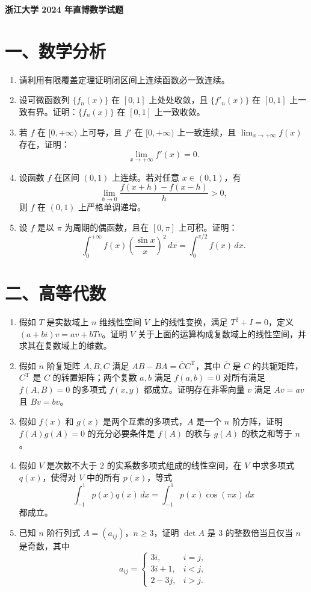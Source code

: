 \documentclass[UTF8,10pt,fontset=none]{ctexart}
\begin{document}
\begin{center}
  {\Large\bfseries 浙江大学 2024 年直博数学试题}
\end{center}
\vspace{1em}

\section*{一、数学分析}
\begin{enumerate}
\item 请利用有限覆盖定理证明闭区间上连续函数必一致连续。
\item 设可微函数列 $\{f_n(x)\}$ 在 $[0,1]$ 上处处收敛，且 $\{f'_n(x)\}$ 在 $[0,1]$ 上一致有界。证明：$\{f_n(x)\}$ 在 $[0,1]$ 上一致收敛。
\item 若 $f$ 在 $[0,+\infty)$ 上可导，且 $f'$ 在 $[0,+\infty)$ 上一致连续，且 $\lim_{x\to+\infty}f(x)$ 存在，证明：
\[
\lim_{x\to+\infty}f'(x)=0.
\]
\item 设函数 $f$ 在区间 $(0,1)$ 上连续。若对任意 $x\in(0,1)$，有
\[
\lim_{h\to0}\frac{f(x+h)-f(x-h)}{h}>0,
\]
则 $f$ 在 $(0,1)$ 上严格单调递增。
\item 设 $f$ 是以 $\pi$ 为周期的偶函数，且在 $[0,\pi]$ 上可积。证明：
\[
\int_0^{+\infty}f(x)\left(\frac{\sin x}{x}\right)^2\,dx
=\int_0^{\pi/2}f(x)\,dx.
\]
\end{enumerate}

\section*{二、高等代数}
\begin{enumerate}
\item 假如 $T$ 是实数域上 $n$ 维线性空间 $V$ 上的线性变换，满足 $T^2+I=0$，定义 $(a+bi)v=av+bTv$。证明 $V$ 关于上面的运算构成复数域上的线性空间，并求其在复数域上的维数。
\item 假如 $n$ 阶复矩阵 $A,B,C$ 满足 $AB-BA=\overline C C^{\mathrm T}$，其中 $\overline C$ 是 $C$ 的共轭矩阵，$C^{\mathrm T}$ 是 $C$ 的转置矩阵；两个复数 $a,b$ 满足 $f(a,b)=0$ 对所有满足 $f(A,B)=0$ 的多项式 $f(x,y)$ 都成立。证明存在非零向量 $v$ 满足 $Av=av$ 且 $Bv=bv$。
\item 假如 $f(x)$ 和 $g(x)$ 是两个互素的多项式，$A$ 是一个 $n$ 阶方阵，证明 $f(A)g(A)=0$ 的充分必要条件是 $f(A)$ 的秩与 $g(A)$ 的秩之和等于 $n$。
\item 假如 $V$ 是次数不大于 $2$ 的实系数多项式组成的线性空间，在 $V$ 中求多项式 $q(x)$，使得对 $V$ 中的所有 $p(x)$，等式
\[
\int_{-1}^{1}p(x)q(x)\,dx=\int_{-1}^{1}p(x)\cos(\pi x)\,dx
\]
都成立。
\item 已知 $n$ 阶行列式 $A=(a_{ij})$，$n\ge3$，证明 $\det A$ 是 $3$ 的整数倍当且仅当 $n$ 是奇数，其中
\[
a_{ij}=\begin{cases}
3i,&i=j,\\
3i+1,&i<j,\\
2-3j,&i>j.
\end{cases}
\]
\end{enumerate}
\end{document}
